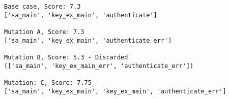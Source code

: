 \begin{lstlisting}[float=h, caption=Mutations performed on abstract inputs, label=lst:mutations]
Base case, Score: 7.3
['sa_main', 'key_ex_main', 'authenticate']

Mutation A, Score: 7.3
['sa_main', 'key_ex_main', 'authenticate_err']

Mutation B, Score: 5.3 - Discarded 
(['sa_main', 'key_ex_main_err', 'authenticate_err'])

Mutation: C, Score: 7.75
['sa_main', 'key_ex_main', 'key_ex_main', 'authenticate_err']
\end{lstlisting}
